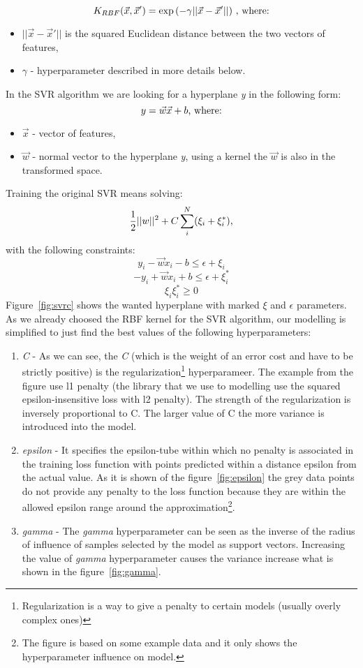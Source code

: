 \[ K_{RBF}(\vec{x}, \vec{x}') = \exp{(-\gamma||\vec{x} - \vec{x}'||)}\ \textnormal{, where:}\]
\begin{itemize}
	\item $ ||\vec{x} - \vec{x}'|| $ is the squared Euclidean distance between the two vectors of features,\newline
	\item $ \gamma $ - hyperparameter described in more details below.
\end{itemize}
In the SVR algorithm we are looking for a hyperplane \textit{y} in the following form:
\[ y = \vec{w} \vec{x} + b \textnormal{, where:}\]
\begin{itemize}
	\item $ \vec{x} $ - vector of features,
	\item $ \vec{w} $ - normal vector to the hyperplane \textit{y}, using a kernel the $ \vec{w} $ is also in the transformed space.
\end{itemize}
Training the original SVR means solving:
\[ \frac{1}{2}||w||^2  + C \sum_{i}^{N}(\xi_i+\xi_i^*) \textnormal{,}\]
with the following constraints:
\[ y_i - \vec{w}x_i - b \le \epsilon + \xi_i  \]
\[ -y_i + \vec{w}x_i + b \le \epsilon + \xi_i^*  \]
\[ \xi_i \xi_i^* \ge 0 \]
Figure~\ref{fig:svrc} shows the wanted hyperplane with marked \textit{$\xi$} and \textit{$\epsilon$} parameters.
As we already choosed the RBF kernel for the SVR algorithm, our modelling is simplified to just find the best values of the following hyperparameters\cite{svr}:
\begin{enumerate}
	\item \textit{C} - As we can see, the \textit{C} (which is the weight of an error cost and have to be strictly positive) is the regularization\footnote{Regularization is a way to give a penalty to certain models (usually overly complex ones)} hyperparameer. The example from the figure use l1 penalty (the library that we use to modelling use the squared epsilon-insensitive loss with l2 penalty). The strength of the regularization is inversely proportional to C. The larger value of C the more variance is introduced into the model. 
	\item \textit{epsilon} - It specifies the epsilon-tube within which no penalty is associated in the training loss function with points predicted within a distance epsilon from the actual value. As it is shown of the figure~\ref{fig:epsilon} the grey data points do not provide any penalty to the loss function because they are within the allowed epsilon range around the approximation\footnote{\label{figure_example}The figure is based on some example data and it only shows the hyperparameter influence on model.}.
	\item \textit{gamma} - The \textit{gamma} hyperparameter can be seen as the inverse of the radius of influence of samples selected by the model as support vectors. Increasing the value of \textit{gamma} hyperparameter causes the variance increase what is shown in the figure~\ref{fig:gamma}.
	
\end{enumerate}

